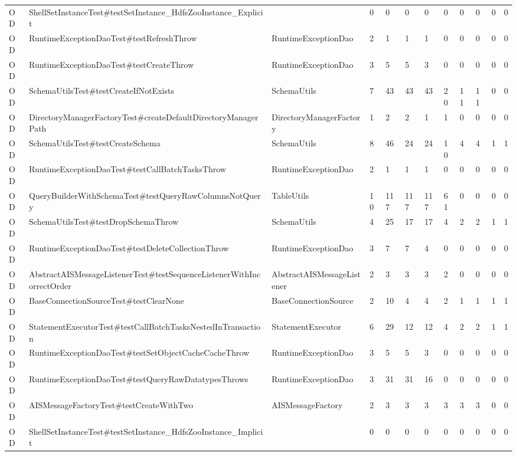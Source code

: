 \begin{table}[t]
\begin{tabular}{llllllllllll}
OD & ShellSetInstanceTest\#testSetInstance\_HdfsZooInstance\_Explicit &  & 0 & 0 & 0 & 0 & 0 & 0 & 0 & 0 & 0 \\
OD & RuntimeExceptionDaoTest\#testRefreshThrow & RuntimeExceptionDao & 2 & 1 & 1 & 1 & 0 & 0 & 0 & 0 & 0 \\
OD & RuntimeExceptionDaoTest\#testCreateThrow & RuntimeExceptionDao & 3 & 5 & 5 & 3 & 0 & 0 & 0 & 0 & 0 \\
OD & SchemaUtilsTest\#testCreateIfNotExists & SchemaUtils & 7 & 43 & 43 & 43 & 20 & 11 & 11 & 0 & 0 \\
OD & DirectoryManagerFactoryTest\#createDefaultDirectoryManagerPath & DirectoryManagerFactory & 1 & 2 & 2 & 1 & 1 & 0 & 0 & 0 & 0 \\
OD & SchemaUtilsTest\#testCreateSchema & SchemaUtils & 8 & 46 & 24 & 24 & 10 & 4 & 4 & 1 & 1 \\
OD & RuntimeExceptionDaoTest\#testCallBatchTasksThrow & RuntimeExceptionDao & 2 & 1 & 1 & 1 & 0 & 0 & 0 & 0 & 0 \\
OD & QueryBuilderWithSchemaTest\#testQueryRawColumnsNotQuery & TableUtils & 10 & 117 & 117 & 117 & 61 & 0 & 0 & 0 & 0 \\
OD & SchemaUtilsTest\#testDropSchemaThrow & SchemaUtils & 4 & 25 & 17 & 17 & 4 & 2 & 2 & 1 & 1 \\
OD & RuntimeExceptionDaoTest\#testDeleteCollectionThrow & RuntimeExceptionDao & 3 & 7 & 7 & 4 & 0 & 0 & 0 & 0 & 0 \\
OD & AbstractAISMessageListenerTest\#testSequenceListenerWithIncorrectOrder & AbstractAISMessageListener & 2 & 3 & 3 & 3 & 2 & 0 & 0 & 0 & 0 \\
OD & BaseConnectionSourceTest\#testClearNone & BaseConnectionSource & 2 & 10 & 4 & 4 & 2 & 1 & 1 & 1 & 1 \\
OD & StatementExecutorTest\#testCallBatchTasksNestedInTransaction & StatementExecutor & 6 & 29 & 12 & 12 & 4 & 2 & 2 & 1 & 1 \\
OD & RuntimeExceptionDaoTest\#testSetObjectCacheCacheThrow & RuntimeExceptionDao & 3 & 5 & 5 & 3 & 0 & 0 & 0 & 0 & 0 \\
OD & RuntimeExceptionDaoTest\#testQueryRawDatatypesThrows & RuntimeExceptionDao & 3 & 31 & 31 & 16 & 0 & 0 & 0 & 0 & 0 \\
OD & AISMessageFactoryTest\#testCreateWithTwo & AISMessageFactory & 2 & 3 & 3 & 3 & 3 & 3 & 3 & 0 & 0 \\
OD & ShellSetInstanceTest\#testSetInstance\_HdfsZooInstance\_Implicit &  & 0 & 0 & 0 & 0 & 0 & 0 & 0 & 0 & 0 \\

\end{tabular}
\end{table}
